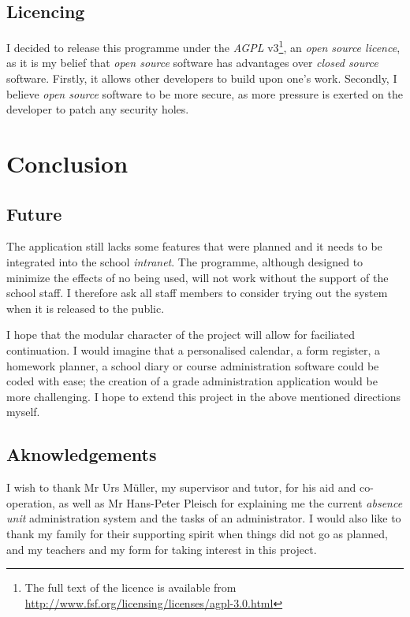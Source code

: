 \documentclass[12pt,a4paper,twoside,openany]{report}
\begin{document}
\section{Licencing}
I decided to release this programme under the \textit{AGPL} v3\footnote{The
full text of the licence is available from
\url{http://www.fsf.org/licensing/licenses/agpl-3.0.html}}, an
\textit{open source licence}, as it is my belief that \textit{open source}
software has advantages over \textit{closed source} software. Firstly, it
allows other developers to build upon one's work. Secondly, I believe
\textit{open source} software to be more secure, as more pressure is exerted on
the developer to patch any security holes.

\chapter{Conclusion}

\section{Future}
The application still lacks some features that were planned and it
needs to be integrated into the school \textit{intranet}. The programme,
although designed to minimize the effects of no being used, will not
work without the support of the school staff. I therefore ask all staff members
to consider trying out the system when it is released to the public.

I hope that the modular character
of the project will allow for faciliated continuation. I would imagine that a
personalised calendar, a form register, a homework planner, a school diary or
course administration software could be coded with ease; the creation of a
grade administration application would be more challenging. I hope to extend
this project in the above mentioned directions myself.

\section{Aknowledgements}
I wish to thank Mr Urs M\"{u}ller, my supervisor and tutor, for his aid and
co-operation, as well as Mr Hans-Peter Pleisch for explaining me the current
\textit{absence unit} administration system and the tasks of an administrator. I would
also like to thank my family for their supporting spirit when things did not go
as planned, and my teachers and my form for taking interest in this project.
\appendix
\end{document}
